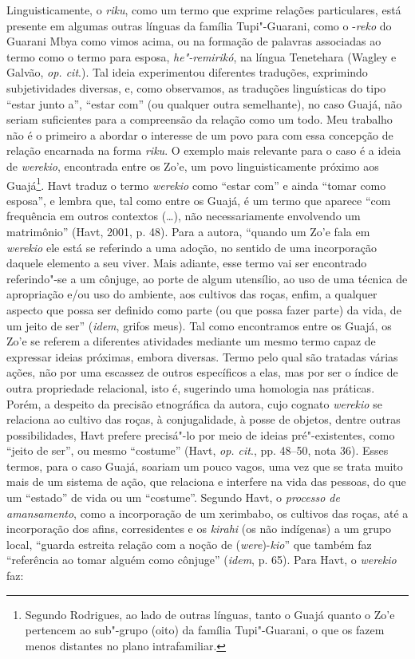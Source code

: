 Linguisticamente, o \emph{riku}, como um termo que exprime relações
particulares, está presente em algumas outras línguas da família
Tupi"-Guarani, como o -\emph{reko} do Guarani Mbya como vimos acima, ou
na formação de palavras associadas ao termo como o termo para esposa,
\emph{he"-remirikó}, na língua Tenetehara (Wagley e Galvão, \emph{op. cit}.).
Tal ideia experimentou diferentes traduções, exprimindo subjetividades
diversas, e, como observamos, as traduções linguísticas do tipo ``estar
junto a'', ``estar com'' (ou qualquer outra semelhante), no caso Guajá, não
seriam suficientes para a compreensão da relação como um todo. Meu
trabalho não é o primeiro a abordar o interesse de um povo para com essa
concepção de relação encarnada na forma \emph{riku}. O exemplo mais
relevante para o caso é a ideia de \emph{werekio}, encontrada entre os
Zo'e, um povo linguisticamente próximo aos Guajá\footnote{Segundo
  Rodrigues, ao lado de outras línguas, tanto o Guajá quanto o Zo'e
  pertencem ao sub"-grupo  (oito) da família Tupi"-Guarani, o que os
  fazem menos distantes no plano intrafamiliar.}. Havt traduz o termo
\emph{werekio} como ``estar com'' e ainda ``tomar como esposa'', e lembra
que, tal como entre os Guajá, é um termo que aparece ``com frequência em
outros contextos (\ldots{}), não necessariamente envolvendo um matrimônio''
(Havt, 2001, p. 48). Para a autora, ``quando um Zo'e fala em
\emph{werekio} ele está se referindo a uma adoção, no sentido de uma
incorporação daquele elemento a seu viver. Mais adiante, esse termo vai
ser encontrado referindo"-se a um cônjuge, ao porte de algum utensílio,
ao uso de uma técnica de apropriação e/ou uso do ambiente, aos cultivos
das roças, enfim, a qualquer aspecto que possa ser definido como parte
(ou que possa fazer parte) da vida, de um jeito de ser'' (\emph{idem}, grifos
meus). Tal como encontramos entre os Guajá, os Zo'e se referem a
diferentes atividades mediante um mesmo termo capaz de expressar ideias
próximas, embora diversas. Termo pelo qual são tratadas várias ações,
não por uma escassez de outros específicos a elas, mas por ser o índice
de outra propriedade relacional, isto é, sugerindo uma homologia nas
práticas. Porém, a despeito da precisão etnográfica da autora, cujo
cognato \emph{werekio} se relaciona ao cultivo das roças, à
conjugalidade, à posse de objetos, dentre outras possibilidades, Havt
prefere precisá"-lo por meio de ideias pré"-existentes, como ``jeito de
ser'', ou mesmo ``costume'' (Havt, \emph{op. cit}., pp. 48--50, nota 36). Esses
termos, para o caso Guajá, soariam um pouco vagos, uma vez que se trata
muito mais de um sistema de ação, que relaciona e interfere na vida das
pessoas, do que um ``estado'' de vida ou um ``costume''. Segundo Havt, o
\emph{processo de amansamento}, como a incorporação de um xerimbabo, os
cultivos das roças, até a incorporação dos afins, corresidentes e os
\emph{kirahi} (os não indígenas) a um grupo local, ``guarda estreita
relação com a noção de (\emph{were})-\emph{kio}'' que também faz
``referência ao tomar alguém como cônjuge'' (\emph{idem}, p. 65). Para Havt, o
\emph{werekio} faz:

